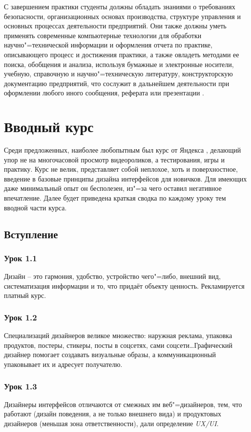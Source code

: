 \documentclass[variant=practice]{bsuir}
\begin{document}
С завершением практики студенты должны обладать знаниями о требованиях
безопасности, организационных основах производства, структуре управления и
основных процессах деятельности предприятий. Они также должны уметь применять
современные компьютерные технологии для обработки научно"=технической информации
и оформления отчета по практике, описывающего процесс и достижения практики, а
также овладеть методами ее поиска, обобщения и анализа, используя бумажные и
электронные носители, учебную, справочную и научно"=техническую литературу,
конструкторскую документацию предприятий, что сослужит в дальнейшем деятельности
при оформлении любого иного сообщения, реферата или презентации
\cite{about-practice}.

\chapter{Вводный курс }

Среди предложенных, наиболее любопытным был курс от Яндекса \cite{about-yandex},
делающий упор не на многочасовой просмотр видеороликов, а тестирования, игры и
практику. Курс не велик, представляет собой неплохое, хоть и поверхностное,
введение в базовые принципы дизайна интерфейсов для новичков. Для имеющих даже
минимальный опыт он бесполезен, из"=за чего оставил негативное впечатление. Далее
будет приведена краткая сводка по каждому уроку тем вводной части курса.

\section{Вступление}

\subsection{Урок 1.1} Дизайн -- это гармония, удобство, устройство чего"=либо,
внешний вид, систематизация информации и то, что придаёт объекту ценность.
Рекламируется платный курс.

\subsection{Урок 1.2} Специализаций дизайнеров великое множество: наружная
реклама, упаковка продуктов, постеры, стикеры, посты в соцсетях, сами
соцсети\dots Графический дизайнер помогает создавать визуальные образы, а
коммуникационный упаковывает их и адресует получателю.

\subsection{Урок 1.3} Дизайнеры интерфейсов отличаются от смежных им
веб"=дизайнеров, тем, что работают (дизайн поведения, а не только внешнего вида)
и продуктовых дизайнеров (меньшая зона ответственности), дали определение
\textit{UX/UI}.
\end{document}
